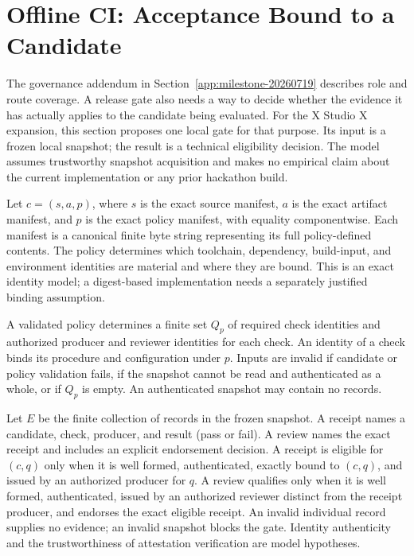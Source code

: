 \clearpage
\section{Offline CI: Acceptance Bound to a Candidate}
\label{app:offline-ci-evidence}

The governance addendum in Section~\ref{app:milestone-20260719}
describes role and route coverage. A release gate also needs a way to
decide whether the evidence it has actually applies to the candidate
being evaluated. For the X Studio X expansion, this section proposes
one local gate for that purpose. Its input is a frozen local snapshot;
the result is a technical eligibility decision. The model assumes
trustworthy snapshot acquisition and makes no empirical claim about
the current implementation or any prior hackathon build.

\begin{definition}
\label{def:offline-ci-snapshot}
Let $c=(s,a,p)$, where $s$ is the exact source manifest, $a$ is the
exact artifact manifest, and $p$ is the exact policy manifest, with
equality componentwise. Each manifest is a canonical finite byte
string representing its full policy-defined contents. The policy
determines which toolchain, dependency, build-input, and environment
identities are material and where they are bound. This is an exact
identity model; a digest-based implementation needs a separately
justified binding assumption.

A validated policy determines a finite set $Q_p$ of required check
identities and authorized producer and reviewer identities for each
check. An identity of a check binds its procedure and configuration
under $p$. Inputs are invalid if candidate or policy validation fails,
if the snapshot cannot be read and authenticated as a whole, or if
$Q_p$ is empty. An authenticated snapshot may contain no records.

Let $E$ be the finite collection of records in the frozen snapshot.
A receipt names a candidate, check, producer, and result (pass or
fail). A review names the exact receipt and includes an explicit
endorsement decision. A receipt is eligible for $(c,q)$ only when
it is well formed, authenticated, exactly bound to $(c,q)$, and
issued by an authorized producer for $q$. A review qualifies only
when it is well formed, authenticated, issued by an authorized
reviewer distinct from the receipt producer, and endorses the exact
eligible receipt. An invalid individual record supplies no evidence;
an invalid snapshot blocks the gate. Identity authenticity and the
trustworthiness of attestation verification are model hypotheses.
\end{definition}


